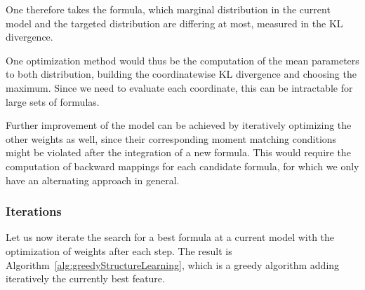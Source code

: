 



One therefore takes the formula, which marginal distribution in the current model and the targeted distribution are differing at most, measured in the KL divergence.

One optimization method would thus be the computation of the mean parameters to both distribution, building the coordinatewise KL divergence and choosing the maximum. 
Since we need to evaluate each coordinate, this can be intractable for large sets of formulas.


Further improvement of the model can be achieved by iteratively optimizing the other weights as well, since their corresponding moment matching conditions might be violated after the integration of a new formula.
This would require the computation of backward mappings for each candidate formula, for which we only have an alternating approach in general.










\subsubsection{Iterations}

Let us now iterate the search for a best formula at a current model with the optimization of weights after each step.
The result is Algorithm~\ref{alg:greedyStructureLearning}, which is a greedy algorithm adding iteratively the currently best feature.

